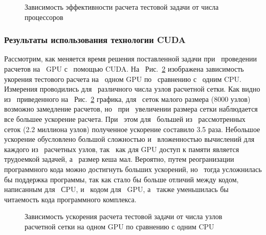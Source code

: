 \begin{figure}[!h]
\begin{center}
\caption{Зависимость эффективности расчета тестовой задачи от числа процессоров}
\label{mpi_eff}
\end{center}
\end{figure}


\subsubsection{Результаты использования технологии CUDA}

Рассмотрим, как меняется время решения поставленной задачи при~ проведении расчетов на~ GPU
с~ помощью CUDA. На~ Рис.~\ref{cuda_speedup} изображена зависимость укорения тестового расчета на~ одном GPU
по~ сравнению с~ одним CPU. Измерения проводились для~ различного числа
узлов расчетной сетки. Как видно из~ приведенного на~ Рис.~\ref{cuda_speedup}
графика, для~ сеток малого размера (8000 узлов) возможно замедление расчетов, но~ при~ увеличении
размера сетки наблюдается все большее ускорение расчета. При~ этом для~ большей из~
рассмотренных сеток (2.2 миллиона узлов) полученное ускорение составило 3.5 раза. Небольшое
ускорение обусловлено большой сложностью и~ вложенностью вычислений для~ каждого из~ расчетных
узлов, так~ как для GPU доступ к памяти является трудоемкой задачей, а~ размер кеша мал. Вероятно,
путем реогранизации программного кода можно достигнуть больших ускорений, но~ тогда усложнилась
бы поддержка программы, так как стало бы больше отличий между кодом, написанным для~ СPU, и~ кодом
для~ GPU, а~ также уменьшилась бы~ читаемость кода программного комплекса.

\begin{figure}[!h]
\begin{center}
\caption{Зависимость ускорения расчета тестовой задачи от числа узлов расчетной сетки на одном GPU по сравнению с одним CPU}
\label{cuda_speedup}
\end{center}
\end{figure}

